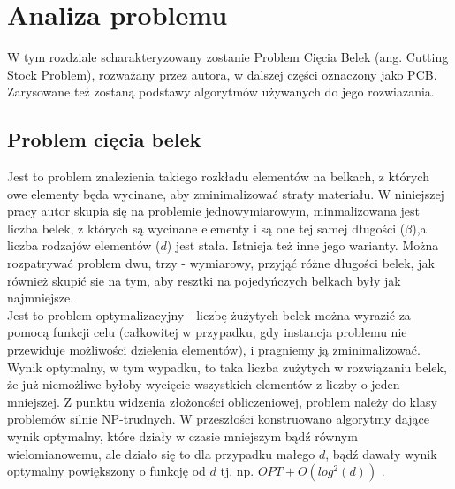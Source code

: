 \chapter{Analiza problemu}
\thispagestyle{chapterBeginStyle}

W tym rozdziale scharakteryzowany zostanie Problem Cięcia Belek (ang. Cutting Stock Problem), rozważany przez autora, w dalszej części oznaczony jako PCB.
Zarysowane też zostaną podstawy algorytmów używanych do jego rozwiazania.

\section{Problem cięcia belek}
Jest to problem znalezienia takiego rozkładu elementów na belkach, z których owe elementy będa wycinane, aby zminimalizować straty materiału.  W niniejszej pracy autor skupia się na problemie jednowymiarowym, minmalizowana jest liczba belek, z których są wycinane elementy i są one tej samej długości ($\beta$),a liczba rodzajów elementów ($d$) jest stała. Istnieja też inne jego warianty. Można rozpatrywać problem dwu, trzy - wymiarowy, przyjąć różne długości belek, jak również skupić sie na tym, aby resztki na pojedyńczych belkach były jak najmniejsze.\\
Jest to problem optymalizacyjny - liczbę żużytych belek można wyrazić za pomocą funkcji celu (całkowitej w przypadku, gdy instancja problemu nie przewiduje możliwości dzielenia elementów), i pragniemy ją zminimalizować.
Wynik optymalny, w tym wypadku, to taka liczba zużytych w rozwiązaniu belek, że już niemożliwe byłoby wycięcie wszystkich elementów z liczby o jeden mniejszej.
Z punktu widzenia złożoności obliczeniowej, problem należy do klasy problemów silnie NP-trudnych. W przeszłości konstruowano algorytmy dające wynik optymalny, które działy w czasie mniejszym bądź równym wielomianowemu, ale działo się to dla przypadku małego $d$, bądź dawały wynik optymalny powiększony o funkcję od $d$ tj. np. $OPT + O(log^2(d))$  \cite{ALG_OPT_1}.

